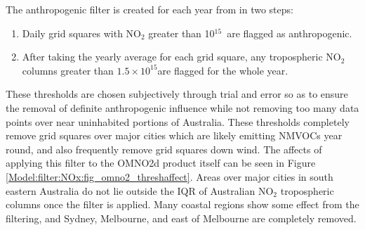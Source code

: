     {\label{Model:filter:NOx:fig_omno2_timeseries}}
    
    The anthropogenic filter is created for each year from in two steps:
    \begin{enumerate}
      \item Daily grid squares with NO$_2$ greater than 10$^{15}$\moleccm  ~are flagged as anthropogenic.
      \item After taking the yearly average for each grid square, any tropospheric NO$_2$ columns greater than $1.5 \times 10^{15}$\moleccm are flagged for the whole year.
    \end{enumerate}
    These thresholds are chosen subjectively through trial and error so as to ensure the removal of definite anthropogenic influence while not removing too many data points over near uninhabited portions of Australia.
    These thresholds completely remove grid squares over major cities which are likely emitting NMVOCs year round, and also frequently remove grid squares down wind.
    The affects of applying this filter to the OMNO2d product itself can be seen in Figure \ref{Model:filter:NOx:fig_omno2_threshaffect}.
    Areas over major cities in south eastern Australia do not lie outside the IQR of Australian NO$_2$ tropospheric columns once the filter is applied.
    Many coastal regions show some effect from the filtering, and Sydney, Melbourne, and east of Melbourne are completely removed.
    
    {\label{Model:filter:NOx:fig_omno2_threshaffect}}
    
